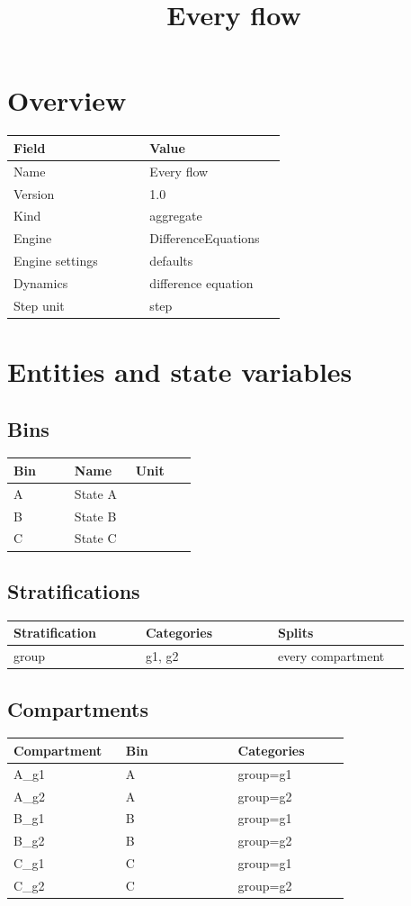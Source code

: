 \documentclass{article}
\title{Every flow}
\date{}
\begin{document}
\maketitle
\section*{Overview}
\begin{longtable}{p{0.45\linewidth}p{0.45\linewidth}}
Field & Value \\
\hline
\endhead
Name & Every flow \\
Version & 1.0 \\
Kind & aggregate \\
Engine & DifferenceEquations \\
Engine settings & defaults \\
Dynamics & difference equation \\
Step unit & step \\
\end{longtable}
\section*{Entities and state variables}
\subsection*{Bins}
\begin{longtable}{p{0.3\linewidth}p{0.3\linewidth}p{0.3\linewidth}}
Bin & Name & Unit \\
\hline
\endhead
A & State A &  \\
B & State B &  \\
C & State C &  \\
\end{longtable}
\subsection*{Stratifications}
\begin{longtable}{p{0.3\linewidth}p{0.3\linewidth}p{0.3\linewidth}}
Stratification & Categories & Splits \\
\hline
\endhead
group & g1, g2 & every compartment \\
\end{longtable}
\subsection*{Compartments}
\begin{longtable}{p{0.3\linewidth}p{0.3\linewidth}p{0.3\linewidth}}
Compartment & Bin & Categories \\
\hline
\endhead
A\_g1 & A & group=g1 \\
A\_g2 & A & group=g2 \\
B\_g1 & B & group=g1 \\
B\_g2 & B & group=g2 \\
C\_g1 & C & group=g1 \\
C\_g2 & C & group=g2 \\
\end{longtable}
\end{document}
